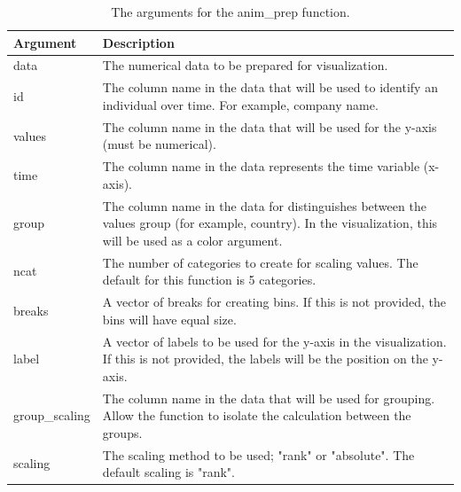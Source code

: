 \begin{table}

\caption{\label{tab:tbl-num-la}The arguments for the anim\_prep function.}
\centering
\begin{tabular}[t]{l|>{\raggedright\arraybackslash}p{30em}}
\hline
Argument & Description\\
\hline
data & The numerical data to be prepared for visualization.\\
\hline
id & The column name in the data that will be used to identify an individual over time. For example, company name.\\
\hline
values & The column name in the data that will be used for the y-axis (must be numerical).\\
\hline
time & The column name in the data represents the time variable (x-axis).\\
\hline
group & The column name in the data for distinguishes between the values group (for example, country). In the visualization, this will be used as a color argument.\\
\hline
ncat & The number of categories to create for scaling values. The default for this function is 5 categories.\\
\hline
breaks & A vector of breaks for creating bins. If this is not provided, the bins will have equal size.\\
\hline
label & A vector of labels to be used for the y-axis in the visualization. If this is not provided, the labels will be the position on the y-axis.\\
\hline
group\_scaling & The column name in the data that will be used for grouping. Allow the function to isolate the calculation between the groups.\\
\hline
scaling & The scaling method to be used; "rank" or "absolute". The default scaling is "rank".\\
\hline
\end{tabular}
\end{table}

